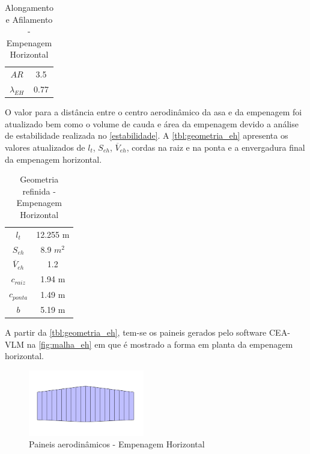 \begin{table}[H]
\centering
\begin{tabular}{cc}
\toprule
$ AR $ & 3.5 \\
$ \lambda_{EH} $ & 0.77 \\
\bottomrule
\end{tabular}
\caption[Alongamento e Afilamento - Empenagem Horizontal]{Alongamento e Afilamento - Empenagem Horizontal}
\label{tbl:AR_eh}
\end{table}

O valor para a distância entre o centro aerodinâmico da asa e da empenagem foi atualizado bem como o volume de cauda e área da empenagem devido a análise de estabilidade realizada no \autoref{estabilidade}. A \autoref{tbl:geometria_eh} apresenta os valores atualizados de $l_t$, $S_{eh}$, $\overline{V}_{eh}$, cordas na raiz e na ponta e a envergadura final da empenagem horizontal.

\begin{table}[H]
\centering
\begin{tabular}{cc}
\toprule
$ l_t $ & 12.255 m \\
$ S_{eh} $ & 8.9 $m^2$ \\
$ \overline{V}_{eh} $ & 1.2 \\
$ c_{raiz} $ & 1.94 m \\
$ c_{ponta} $ & 1.49 m \\
$ b $ & 5.19 m \\
\bottomrule
\end{tabular}
\caption[Geometria refinida - Empenagem Horizontal]{Geometria refinida - Empenagem Horizontal}
\label{tbl:geometria_eh}
\end{table}


A partir da \autoref{tbl:geometria_eh}, tem-se os paineis gerados pelo software CEA-VLM na \autoref{fig:malha_eh} em que é mostrado a forma em planta da empenagem horizontal.

\begin{figure}[H]
\centering
\includegraphics[width=0.45\textwidth]{images/parte3/malha_eh.PNG}
\caption[Paineis aerodinâmicos - Empenagem Horizontal]{Paineis aerodinâmicos - Empenagem Horizontal}
\label{fig:malha_eh}
\end{figure}

